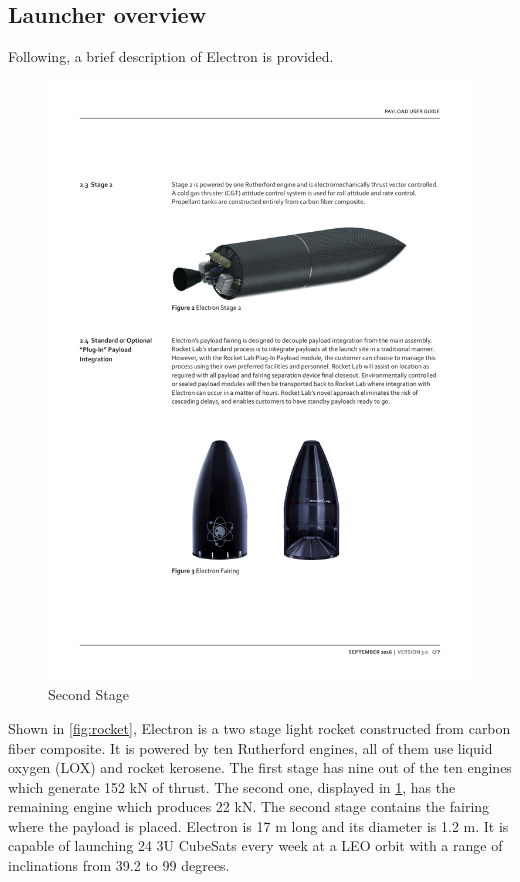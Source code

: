 	\subsection{Launcher overview}
Following, a brief description of Electron is provided. 
\newline
\newline
\begin{figure}
\centering 
\includegraphics[scale=0.6]{./sections/Constellation_Deployment/S2-Launcher/Images_S2/Picture_2_S2.pdf} 
\caption{Second Stage}
\label{fig:second}
\end{figure}
Shown in \ref{fig:rocket}, Electron is a two stage light rocket constructed from carbon fiber composite. It is powered by ten Rutherford engines, all of them use liquid oxygen (LOX) and rocket kerosene. The first stage has nine out of the ten engines which generate 152 kN of thrust. The second one, displayed in \ref{fig:second}, has the remaining engine which produces 22 kN. The second stage contains the fairing where the payload is placed. Electron is 17 m long and its diameter is 1.2 m. It is capable of launching 24 3U CubeSats every week at a LEO orbit with a range of inclinations from 39.2 to 99 degrees. 



